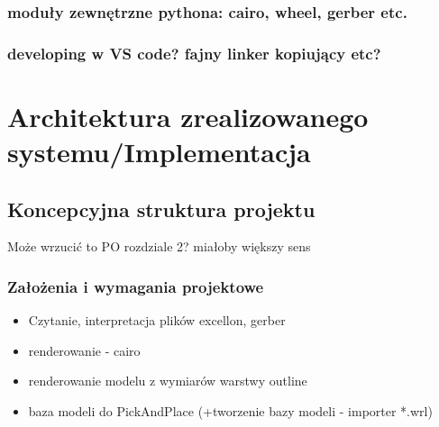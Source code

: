 \documentclass[brudnopis]{xmgr}
\begin{document}
\subsection{moduły zewnętrzne pythona: cairo, wheel, gerber etc.}
\subsection{developing w VS code? fajny linker kopiujący etc?}









\chapter{Architektura zrealizowanego systemu/Implementacja}

\section {Koncepcyjna struktura projektu}
Może wrzucić to PO rozdziale 2? miałoby większy sens

\subsection{Założenia i wymagania projektowe}
\begin{itemize}
\item Czytanie, interpretacja plików excellon, gerber
\item renderowanie - cairo
\item renderowanie modelu z wymiarów warstwy outline
\item baza modeli do PickAndPlace (+tworzenie bazy modeli - importer *.wrl)
\end{itemize}
\end{document}
